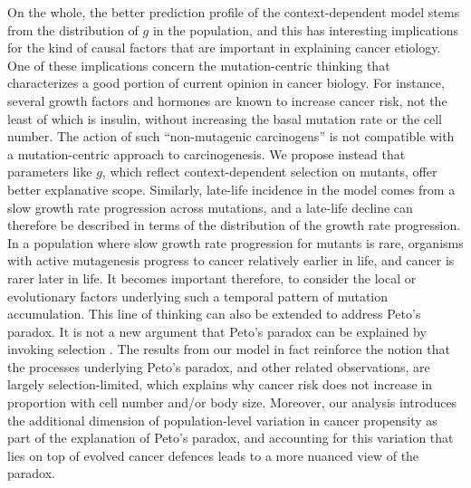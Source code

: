 \documentclass[9pt,twocolumn,twoside]{pnas-new}
\begin{document}
On the whole, the better prediction profile of the context-dependent model stems from the distribution of $g$ in the population, and this has interesting implications for the kind of causal factors that are important in explaining cancer etiology. One of these implications concern the mutation-centric thinking that characterizes a good portion of current opinion in cancer biology. For instance, several growth factors and hormones are known to increase cancer risk, not the least of which is insulin, without increasing the basal mutation rate or the cell number. The action of such ``non-mutagenic carcinogens'' is not compatible with a mutation-centric approach to carcinogenesis. We propose instead that parameters like $g$, which reflect context-dependent selection on mutants, offer better explanative scope.
Similarly, late-life incidence in the model comes from a slow growth rate progression across mutations, and a late-life decline can therefore be described in terms of the distribution of the growth rate progression. In a population where slow growth rate progression for mutants is rare, organisms with active mutagenesis progress to cancer relatively earlier in life, and cancer is rarer later in life. It becomes important therefore, to consider the local or evolutionary factors underlying such a temporal pattern of mutation accumulation.
This line of thinking can also be extended to address Peto's paradox. It is not a new argument that Peto's paradox can be explained by invoking selection \cite{Caulin2011,Noble2015,Tollis2017b}. The results from our model in fact reinforce the notion that the processes underlying Peto's paradox, and other related observations, are largely selection-limited, which explains why cancer risk does not increase in proportion with cell number and/or body size. Moreover, our analysis introduces the additional dimension of population-level variation in cancer propensity as part of the explanation of Peto's paradox, and accounting for this variation that lies on top of evolved cancer defences leads to a more nuanced view of the paradox. 
\end{document}
